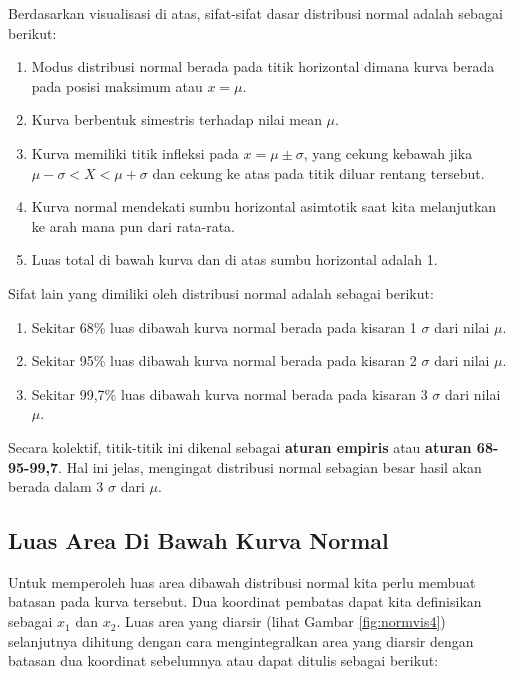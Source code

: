 \documentclass[]{book}
\providecommand{\tightlist}{%
  \setlength{\itemsep}{0pt}\setlength{\parskip}{0pt}}
\begin{document}
Berdasarkan visualisasi di atas, sifat-sifat dasar distribusi normal
adalah sebagai berikut:

\begin{enumerate}
\def\labelenumi{\arabic{enumi}.}
\tightlist
\item
  Modus distribusi normal berada pada titik horizontal dimana kurva
  berada pada posisi maksimum atau \(x=\mu\).
\item
  Kurva berbentuk simestris terhadap nilai mean \(\mu\).
\item
  Kurva memiliki titik infleksi pada \(x=\mu \pm \sigma\), yang cekung
  kebawah jika \(\mu-\sigma<X<\mu+\sigma\) dan cekung ke atas pada titik
  diluar rentang tersebut.
\item
  Kurva normal mendekati sumbu horizontal asimtotik saat kita
  melanjutkan ke arah mana pun dari rata-rata.
\item
  Luas total di bawah kurva dan di atas sumbu horizontal adalah 1.
\end{enumerate}

Sifat lain yang dimiliki oleh distribusi normal adalah sebagai berikut:

\begin{enumerate}
\def\labelenumi{\arabic{enumi}.}
\tightlist
\item
  Sekitar 68\% luas dibawah kurva normal berada pada kisaran 1
  \(\sigma\) dari nilai \(\mu\).
\item
  Sekitar 95\% luas dibawah kurva normal berada pada kisaran 2
  \(\sigma\) dari nilai \(\mu\).
\item
  Sekitar 99,7\% luas dibawah kurva normal berada pada kisaran 3
  \(\sigma\) dari nilai \(\mu\).
\end{enumerate}

Secara kolektif, titik-titik ini dikenal sebagai \textbf{aturan empiris}
atau \textbf{aturan 68-95-99,7}. Hal ini jelas, mengingat distribusi
normal sebagian besar hasil akan berada dalam 3 \(\sigma\) dari \(\mu\).

\subsection{Luas Area Di Bawah Kurva
Normal}\label{luas-area-di-bawah-kurva-normal}

Untuk memperoleh luas area dibawah distribusi normal kita perlu membuat
batasan pada kurva tersebut. Dua koordinat pembatas dapat kita
definisikan sebagai \(x_1\) dan \(x_2\). Luas area yang diarsir (lihat
Gambar \ref{fig:normvis4}) selanjutnya dihitung dengan cara
mengintegralkan area yang diarsir dengan batasan dua koordinat
sebelumnya atau dapat ditulis sebagai berikut:
\end{document}
